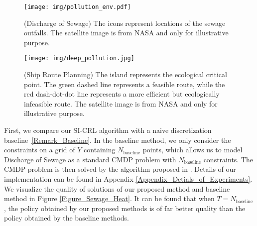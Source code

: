 \begin{figure}[htb]
\begin{minipage}[htb]{0.45\linewidth}
    \centering
    \texttt{[image: img/pollution\_env.pdf]}
    \caption{(Discharge of Sewage) The icons represent locations of the sewage outfalls.
    The satellite image is from NASA and only for illustrative purpose.}
    \label{Figure_Sewage_Env}  
\end{minipage}
\hspace{.15in}
\begin{minipage}[htb]{0.45\linewidth}
    \centering
    \vspace{2.9cm}
    \texttt{[image: img/deep\_pollution.jpg]}
    \caption{(Ship Route Planning) The island represents the ecological critical point. The green dashed line represents a feasible route, while the red dash-dot-dot line represents a more efficient but ecologically infeasible route.
    The satellite image is from NASA and only for illustrative purpose.}
    \label{Figure_Route_Env}  
\end{minipage}
\end{figure}

First, we compare our SI-CRL algorithm with a naive discretization baseline~\ref{Remark_Baseline}.
In the baseline method, we only consider the constraints on a grid of $Y$ containing $N_{\text{baseline}}$ points, which allows us to model Discharge of Sewage as a standard CMDP problem with $N_{\text{baseline}}$ constraints.
The CMDP problem is then solved by the algorithm proposed in \cite{efroni2020explorationexploitation}.
Details of our implementation can be found in Appendix \ref{Appendix_Detials_of_Experiments}.
We visualize the quality of solutions of our proposed method and baseline method in Figure \ref{Figure_Sewage_Heat}.
It can be found that when $T=N_{\text{baseline}}$, the policy obtained by our proposed methods is of far better quality than the policy obtained by the baseline methods.

